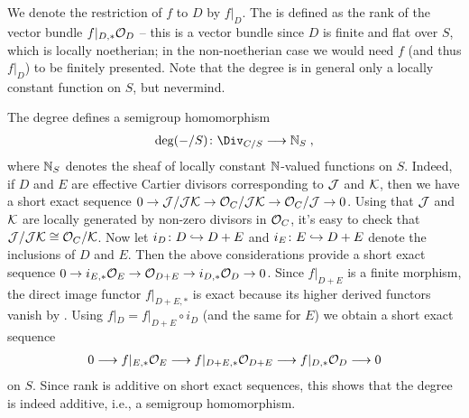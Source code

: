 \documentclass[a4paper,parskip=half,numbers=enddot, DIV=12]{scrreprt}
\begin{document}
\begin{rem}
	We denote the restriction of $f$ to $D$ by $f|_D$. The  is defined as the rank of the vector bundle $f|_{D,*}\mathcal{O}_D$ -- this is a vector bundle since $D$ is finite and flat over $S$, which is locally noetherian; in the non-noetherian case we would need $f$ (and thus $f|_D$) to be finitely presented. Note that the degree is in general only a locally constant function on $S$, but nevermind.
		
	The degree defines a semigroup homomorphism
	\begin{align*}
		\deg(-/S)\colon \Div_{C/S}\morphism \IN_S\;,
	\end{align*}
	where $\mathbb{N}_S$ denotes the sheaf of locally constant $\mathbb{N}$-valued functions on $S$. Indeed, if $D$ and $E$ are effective Cartier divisors corresponding to $\mathcal{J}$ and $\mathcal{K}$, then we have a short exact sequence $0\morphism \Jj/\Jj\Kk\morphism\Oo_C/\Jj\Kk\morphism\Oo_C/\Jj\morphism 0$. Using that $\mathcal{J}$ and $\mathcal{K}$ are locally generated by non-zero divisors in $\mathcal{O}_C$, it's easy to check that $\mathcal{J}/\mathcal{J}\mathcal{K}\cong \mathcal{O}_C/\mathcal{K}$. Now let $i_D\colon D\monomorphism D+E$ and $i_E\colon E\monomorphism D+E$ denote the inclusions of $D$ and $E$. Then the above considerations provide a short exact sequence $0\morphism i_{E,*}\Oo_E\morphism\Oo_{D+E}\morphism i_{D,*}\Oo_D\morphism 0$. Since $f|_{D+E}$ is  a finite morphism, the direct image functor $f|_{D+E,*}$ is exact because its higher derived functors vanish by \cite[Proposition~1.6.1]{alggeo2}. Using $f|_D=f|_{D+E}\circ i_D$ (and the same for $E$) we obtain a short exact sequence
	\begin{align*}
		0\morphism f|_{E,*}\Oo_E\morphism f|_{D+E,*}\Oo_{D+E}\morphism f|_{D,*}\Oo_D\morphism 0
	\end{align*}
	on $S$. Since rank is additive on short exact sequences, this shows that the degree is indeed additive, i.e., a semigroup homomorphism.
\end{rem}
\end{document}
